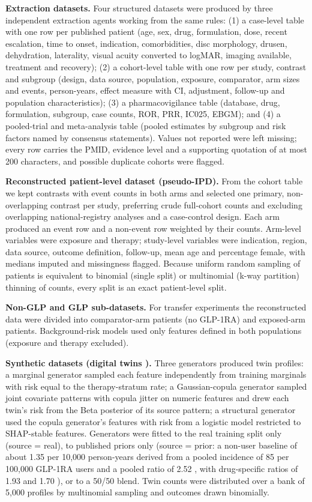 \documentclass[journal]{IEEEtran}
\begin{document}
\textbf{Extraction datasets.} Four structured datasets were produced by
three independent extraction agents working from the same rules: (1) a
case-level table with one row per published patient (age, sex, drug,
formulation, dose, recent escalation, time to onset, indication,
comorbidities, disc morphology, drusen, dehydration, laterality, visual
acuity converted to logMAR, imaging available, treatment and recovery);
(2) a cohort-level table with one row per study, contrast and subgroup
(design, data source, population, exposure, comparator, arm sizes and
events, person-years, effect measure with CI, adjustment, follow-up and
population characteristics); (3) a pharmacovigilance table (database,
drug, formulation, subgroup, case counts, ROR, PRR, IC025, EBGM); and
(4) a pooled-trial and meta-analysis table (pooled estimates by subgroup
and risk factors named by consensus statements). Values not reported
were left missing; every row carries the PMID, evidence level and a
supporting quotation of at most 200 characters, and possible duplicate
cohorts were flagged.

\textbf{Reconstructed patient-level dataset (pseudo-IPD).} From the
cohort table we kept contrasts with event counts in both arms and
selected one primary, non-overlapping contrast per study, preferring
crude full-cohort counts and excluding overlapping national-registry
analyses and a case-control design. Each arm produced an event row and a
non-event row weighted by their counts. Arm-level variables were
exposure and therapy; study-level variables were indication, region,
data source, outcome definition, follow-up, mean age and percentage
female, with medians imputed and missingness flagged. Because uniform
random sampling of patients is equivalent to binomial (single split) or
multinomial (k-way partition) thinning of counts, every split is an
exact patient-level split.

\textbf{Non-GLP and GLP sub-datasets.} For transfer experiments the
reconstructed data were divided into comparator-arm patients (no
GLP-1RA) and exposed-arm patients. Background-risk models used only
features defined in both populations (exposure and therapy excluded).

\textbf{Synthetic datasets (digital twins \cite{kamelboulos2021}).}
Three generators produced twin profiles: a marginal generator sampled
each feature independently from training marginals with risk equal to
the therapy-stratum rate; a Gaussian-copula generator \cite{patki2016}
sampled joint covariate patterns with copula jitter on numeric features
and drew each twin's risk from the Beta posterior of its source pattern;
a structural generator used the copula generator's features with risk
from a logistic model restricted to SHAP-stable features. Generators
were fitted to the real training split only (source = real), to
published priors only (source = prior: a non-user baseline of about 1.35
per 10,000 person-years derived from a pooled incidence of 85 per
100,000 GLP-1RA users and a pooled ratio of 2.52 \cite{p42060879}, with
drug-specific ratios of 1.93 and 1.70 \cite{p42612051, p41498755}), or
to a 50/50 blend. Twin counts were distributed over a bank of 5,000
profiles by multinomial sampling and outcomes drawn binomially.
\end{document}
